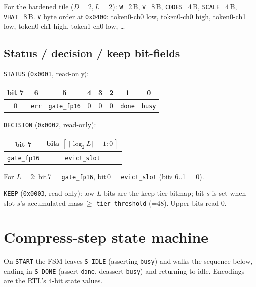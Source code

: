 \documentclass[11pt]{article}
\newcommand{\reg}[1]{\texttt{#1}}
\newcommand{\hx}[1]{\texttt{0x#1}}
\begin{document}
For the hardened tile ($D{=}2,L{=}2$): \reg{W}=2\,B, \reg{V}=8\,B,
\reg{CODES}=4\,B, \reg{SCALE}=4\,B, \reg{VHAT}=8\,B. \reg{V} byte order at
\hx{0400}: token0-ch0 low, token0-ch0 high, token0-ch1 low, token0-ch1 high,
token1-ch0 low, \ldots

\subsection{Status / decision / keep bit-fields}
\reg{STATUS} (\hx{0001}, read-only):
\begin{center}
\begin{tabular}{@{}c|c|c|c|c|c|c|c@{}}
\toprule
bit 7 & 6 & 5 & 4 & 3 & 2 & 1 & 0 \\
\midrule
0 & \reg{err} & \reg{gate\_fp16} & 0 & 0 & 0 & \reg{done} & \reg{busy} \\
\bottomrule
\end{tabular}
\end{center}

\reg{DECISION} (\hx{0002}, read-only):
\begin{center}
\begin{tabular}{@{}c|c@{}}
\toprule
bit 7 & bits $[\,\lceil\log_2 L\rceil{-}1 : 0\,]$ \\
\midrule
\reg{gate\_fp16} & \reg{evict\_slot} \\
\bottomrule
\end{tabular}
\end{center}
For $L{=}2$: bit\,7 = \reg{gate\_fp16}, bit\,0 = \reg{evict\_slot} (bits 6..1 = 0).

\reg{KEEP} (\hx{0003}, read-only): low $L$ bits are the keep-tier bitmap; bit $s$
is set when slot $s$'s accumulated mass $\ge$ \reg{tier\_threshold} (=48). Upper
bits read 0.

\section{Compress-step state machine}
On \reg{START} the FSM leaves \reg{S\_IDLE} (asserting \reg{busy}) and walks the
sequence below, ending in \reg{S\_DONE} (assert \reg{done}, deassert \reg{busy})
and returning to idle. Encodings are the RTL's 4-bit state values.
\end{document}
